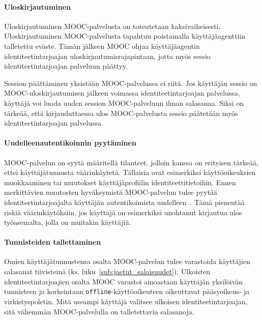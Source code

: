 \documentclass[finnish,gradu]{tktltiki}
\begin{document}

  \paragraph{Uloskirjautuminen} \hfill %
  \label{par:uloskirjautumisesta}

  Uloskirjautuminen MOOC-palvelusta on toteutetaan kaksivaiheisesti. Uloskirjautuminen MOOC-palvelusta tapahtuu poistamalla käyttäjäagenttiin talletettu eväste. Tämän jälkeen MOOC ohjaa käyttäjäagentin identiteetintarjoajan uloskirjautumisrajapintaan, jotta myös sessio identiteetintarjoajan palveluun päättyy.

  Session päättäminen yksistään MOOC-palvelussa ei riitä. Jos käyttäjän sessio on MOOC-uloskirjautumisen jälkeen voimassa identiteetintarjoajan palvelussa, käyttäjä voi luoda uuden session MOOC-palveluun ilman salasanaa. Siksi on tärkeää, että kirjauduttaessa ulos MOOC-palvelusta sessio päätetään myös identiteetintarjoajan palvelussa.


  \paragraph{Uudelleenautentikoinnin pyytäminen} \hfill %
  \label{par:pakotettu_uudelleenautentikointi}

  MOOC-palvelun on syytä määritellä tilanteet, jolloin kanssa on erityisen tärkeää, ettei käyttäjätunnusta väärinkäytetä. Tällaisia ovat esimerkiksi käyttöoikeuksien muokkaaminen tai muutokset käyttäjäprofiilin identiteettitietoihin. Ennen merkittävien muutosten hyväksymistä MOOC-palvelun tulee pyytää identiteetintarjoajalta käyttäjän autentikoimista uudelleen~\cite{facebook_oauth2_reauth, google_oauth2_webserver}. Tämä pienentää riskiä väärinkäytöksiin, jos käyttäjä on esimerkiksi unohtanut kirjautua ulos työasemalta, jolla on muitakin käyttäjiä.


  \paragraph{Tunnisteiden tallettaminen} \hfill %
  \label{par:tietoturva}

  Omien käyttäjätunnustensa osalta MOOC-palvelun tulee varastoida käyttäjien salasanat tiivisteinä (ks. luku~\ref{sub:jaetut_salaisuudet}). Ulkoisten identiteetintarjoajien osalta MOOC varastoi ainoastaan käyttäjän yksilöivän tunnisteen ja korkeintaan \verb!offline!-käyttöoikeuteen oikeuttavat pääsyoikeus- ja virkistyspoletin. Mitä useampi käyttäjä valitsee ulkoisen identiteetintarjoajan, sitä vähemmän MOOC-palvelulla on talletettavia salasanoja.
\end{document}

